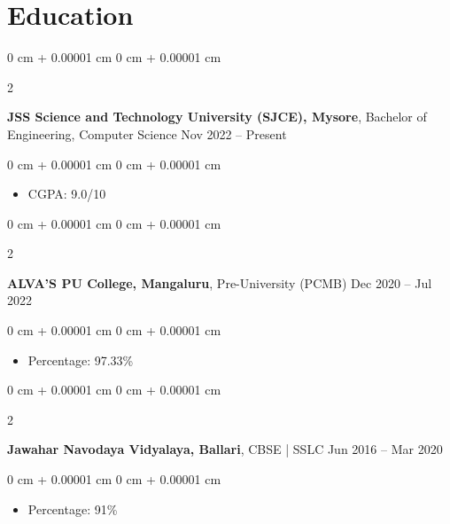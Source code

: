 \documentclass[10pt, letterpaper]{article}
\newenvironment{highlights}{
    \begin{itemize}[
        topsep=0.10 cm,
        parsep=0.10 cm,
        partopsep=0pt,
        itemsep=0pt,
        leftmargin=0 cm + 10pt
    ]
}{
    \end{itemize}
} %
\newenvironment{onecolentry}{
    \begin{adjustwidth}{
        0 cm + 0.00001 cm
    }{
        0 cm + 0.00001 cm
    }
}{
    \end{adjustwidth}
} %
\newenvironment{twocolentry}[2][]{
    \onecolentry
    \def\secondColumn{#2}
    \setcolumnwidth{\fill, 4.5 cm}
    \begin{paracol}{2}
}{
    \switchcolumn \raggedleft \secondColumn
    \end{paracol}
    \endonecolentry
} %
\begin{document}
    \section{Education}

        \begin{twocolentry}{
            Nov 2022 – Present
        }
            \textbf{JSS Science and Technology University (SJCE), Mysore}, Bachelor of Engineering, Computer Science\end{twocolentry}

        \vspace{0.10 cm}
        \begin{onecolentry}
            \begin{highlights}
                \item CGPA: 9.0/10
            \end{highlights}
        \end{onecolentry}

        \vspace{0.2 cm}

        \begin{twocolentry}{
            Dec 2020 – Jul 2022
        }
            \textbf{ALVA'S PU College, Mangaluru}, Pre-University (PCMB)\end{twocolentry}

        \vspace{0.10 cm}
        \begin{onecolentry}
            \begin{highlights}
                \item Percentage: 97.33\%
            \end{highlights}
        \end{onecolentry}

        \vspace{0.2 cm}

        \begin{twocolentry}{
            Jun 2016 – Mar 2020
        }
            \textbf{Jawahar Navodaya Vidyalaya, Ballari}, CBSE | SSLC\end{twocolentry}

        \vspace{0.10 cm}
        \begin{onecolentry}
            \begin{highlights}
                \item Percentage: 91\%
            \end{highlights}
        \end{onecolentry}
\end{document}
